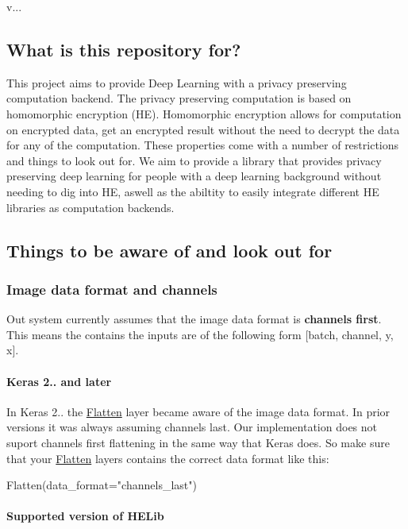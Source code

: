 v...

\subsection*{What is this repository for?}

This project aims to provide Deep Learning with a privacy preserving computation backend. The privacy preserving computation is based on homomorphic encryption (HE). Homomorphic encryption allows for computation on encrypted data, get an encrypted result without the need to decrypt the data for any of the computation. These properties come with a number of restrictions and things to look out for. We aim to provide a library that provides privacy preserving deep learning for people with a deep learning background without needing to dig into HE, aswell as the abiltity to easily integrate different HE libraries as computation backends.

\subsection*{Things to be aware of and look out for}

\subsubsection*{Image data format and channels}

Out system currently assumes that the image data format is {\bfseries channels first}. This means the contains the inputs are of the following form {\ttfamily \mbox{[}batch, channel, y, x\mbox{]}}.

\paragraph*{Keras 2.. and later}

In Keras 2.. the {\ttfamily \hyperlink{classFlatten}{Flatten}} layer became aware of the image data format. In prior versions it was always assuming channels last. Our implementation does not suport channels first flattening in the same way that Keras does. So make sure that your {\ttfamily \hyperlink{classFlatten}{Flatten}} layers contains the correct data format like this\+:


\begin{DoxyCode}
Flatten(data\_format="channels\_last")
\end{DoxyCode}


\paragraph*{Supported version of H\+E\+Lib}


